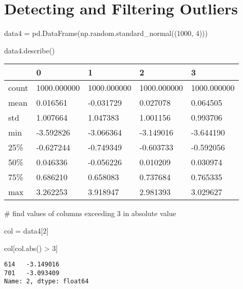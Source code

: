 \documentclass[
  letterpaper,
  DIV=11,
  numbers=noendperiod]{scrreprt}
\newenvironment{Shaded}{\begin{snugshade}}{\end{snugshade}}
\newcommand{\BuiltInTok}[1]{\textcolor[rgb]{0.00,0.23,0.31}{#1}}
\newcommand{\CommentTok}[1]{\textcolor[rgb]{0.37,0.37,0.37}{#1}}
\newcommand{\DecValTok}[1]{\textcolor[rgb]{0.68,0.00,0.00}{#1}}
\newcommand{\NormalTok}[1]{\textcolor[rgb]{0.00,0.23,0.31}{#1}}
\newcommand{\OperatorTok}[1]{\textcolor[rgb]{0.37,0.37,0.37}{#1}}
\begin{document}
\hypertarget{detecting-and-filtering-outliers}{%
\section{Detecting and Filtering
Outliers}\label{detecting-and-filtering-outliers}}

\begin{Shaded}
\begin{Highlighting}[]
\NormalTok{data4 }\OperatorTok{=}\NormalTok{ pd.DataFrame(np.random.standard\_normal((}\DecValTok{1000}\NormalTok{, }\DecValTok{4}\NormalTok{)))}

\NormalTok{data4.describe()}
\end{Highlighting}
\end{Shaded}

\begin{longtable}[]{@{}lllll@{}}
\toprule\noalign{}
& 0 & 1 & 2 & 3 \\
\midrule\noalign{}
\endhead
\bottomrule\noalign{}
\endlastfoot
count & 1000.000000 & 1000.000000 & 1000.000000 & 1000.000000 \\
mean & 0.016561 & -0.031729 & 0.027078 & 0.064505 \\
std & 1.007664 & 1.047383 & 1.001156 & 0.993706 \\
min & -3.592826 & -3.066364 & -3.149016 & -3.644190 \\
25\% & -0.627244 & -0.749349 & -0.603733 & -0.592056 \\
50\% & 0.046336 & -0.056226 & 0.010209 & 0.030974 \\
75\% & 0.686210 & 0.658083 & 0.737684 & 0.765335 \\
max & 3.262253 & 3.918947 & 2.981393 & 3.029627 \\
\end{longtable}

\begin{Shaded}
\begin{Highlighting}[]
\CommentTok{\# find values of columns exceeding 3 in absolute value}

\NormalTok{col }\OperatorTok{=}\NormalTok{ data4[}\DecValTok{2}\NormalTok{]}

\NormalTok{col[col.}\BuiltInTok{abs}\NormalTok{() }\OperatorTok{\textgreater{}} \DecValTok{3}\NormalTok{]}
\end{Highlighting}
\end{Shaded}

\begin{verbatim}
614   -3.149016
701   -3.093409
Name: 2, dtype: float64
\end{verbatim}
\end{document}
